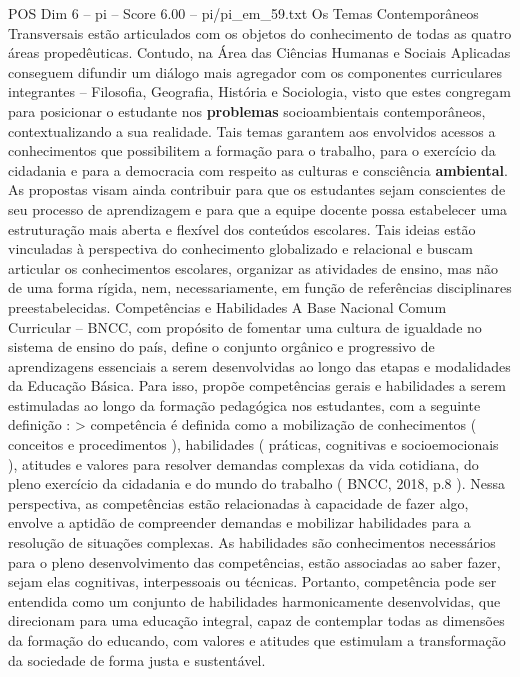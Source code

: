 \begin{textsample}{POS Dim 6 – pi – Score 6.00 – pi/pi\_em\_59.txt}  \label{ex:f6_pos_196}
Os Temas Contemporâneos Transversais estão articulados com os objetos do conhecimento de todas as quatro áreas propedêuticas.
Contudo, na Área das Ciências Humanas e Sociais Aplicadas conseguem difundir um diálogo mais agregador com os componentes curriculares integrantes – Filosofia, Geografia, História e Sociologia, visto que estes congregam para posicionar o estudante nos \textbf{problemas} socioambientais contemporâneos, contextualizando a sua realidade.
Tais temas garantem aos envolvidos acessos a conhecimentos que possibilitem a formação para o trabalho, para o exercício da cidadania e para a democracia com respeito as culturas e consciência \textbf{ambiental}.
As propostas visam ainda contribuir para que os estudantes sejam conscientes de seu processo de aprendizagem e para que a equipe docente possa estabelecer uma estruturação mais aberta e flexível dos conteúdos escolares.
Tais ideias estão vinculadas à perspectiva do conhecimento globalizado e relacional e buscam articular os conhecimentos escolares, organizar as atividades de ensino, mas não de uma forma rígida, nem, necessariamente, em função de referências disciplinares preestabelecidas.
Competências e Habilidades A Base Nacional Comum Curricular – BNCC, com propósito de fomentar uma cultura de igualdade no sistema de ensino do país, define o conjunto orgânico e progressivo de aprendizagens essenciais a serem desenvolvidas ao longo das etapas e modalidades da Educação Básica.
Para isso, propõe competências gerais e habilidades a serem estimuladas ao longo da formação pedagógica nos estudantes, com a seguinte definição : > competência é definida como a mobilização de conhecimentos ( conceitos e procedimentos ), habilidades ( práticas, cognitivas e socioemocionais ), atitudes e valores para resolver demandas complexas da vida cotidiana, do pleno exercício da cidadania e do mundo do trabalho ( BNCC, 2018, p.8 ).
Nessa perspectiva, as competências estão relacionadas à capacidade de fazer algo, envolve a aptidão de compreender demandas e mobilizar habilidades para a resolução de situações complexas.
As habilidades são conhecimentos necessários para o pleno desenvolvimento das competências, estão associadas ao saber fazer, sejam elas cognitivas, interpessoais ou técnicas.
Portanto, competência pode ser entendida como um conjunto de habilidades harmonicamente desenvolvidas, que direcionam para uma educação integral, capaz de contemplar todas as dimensões da formação do educando, com valores e atitudes que estimulam a transformação da sociedade de forma justa e sustentável.

\end{textsample}
